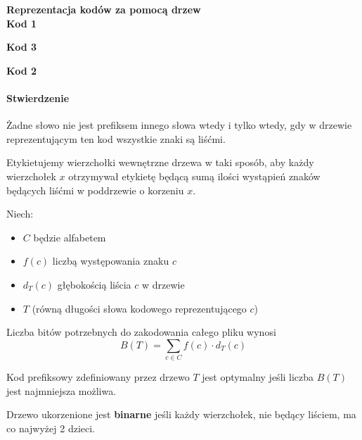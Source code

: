 \textbf{Reprezentacja kodów za pomocą drzew}\\
\textbf{Kod 1}

\textbf{Kod 3}

\textbf{Kod 2}

\paragraph{Stwierdzenie} Żadne słowo nie jest prefiksem innego słowa wtedy i tylko wtedy, gdy w drzewie reprezentującym ten kod wszystkie znaki są liśćmi.
\begin{center}
\end{center}

Etykietujemy wierzchołki wewnętrzne drzewa w taki sposób, aby każdy wierzchołek $x$ otrzymywał etykietę będącą sumą ilości wystąpień znaków będących liśćmi w poddrzewie o korzeniu $x$. 

Niech:
\begin{itemize}
\item $C$ będzie alfabetem
\item $f(c)$ liczbą występowania znaku $c$
\item $d_T(c)$ głębokością liścia $c$ w drzewie 
\item $T$ (równą długości słowa kodowego reprezentującego $c$)
\end{itemize}  Liczba bitów potrzebnych do zakodowania całego pliku wynosi 
$$B(T) = \sum_{c \in C} f(c) \cdot d_T(c)$$

Kod prefiksowy zdefiniowany przez drzewo $T$ jest optymalny jeśli liczba $B(T)$ jest najmniejsza możliwa.

Drzewo ukorzenione jest \textbf{binarne} jeśli każdy wierzchołek, nie będący liściem, ma co najwyżej 2 dzieci.

